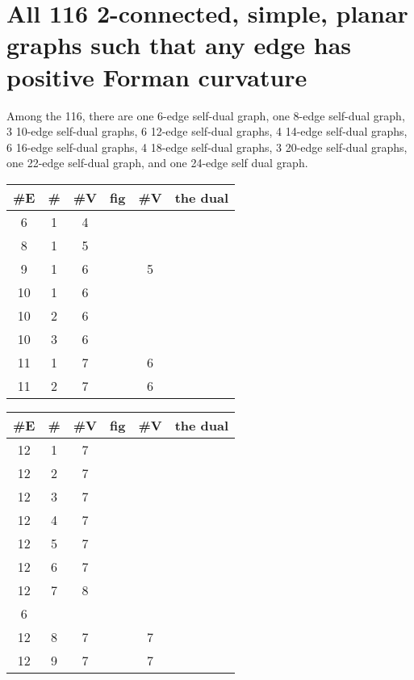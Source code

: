 \documentclass{amsart}
\begin{document}
\section{All 116 2-connected, simple, planar graphs such that any edge
 has positive Forman curvature}

 Among the 116, there are one 6-edge self-dual graph, one 8-edge self-dual graph, 3
 10-edge self-dual graphs, 6 12-edge self-dual graphs, 4 14-edge
 self-dual graphs, 6 16-edge self-dual graphs, 4 18-edge self-dual
 graphs, 3 20-edge self-dual graphs, one 22-edge self-dual graph, and
 one 24-edge self dual graph.
 
  \def\a#1{\texttt{[image: \#1]}}
 \begin{table}[ht]
     \begin{tabular}{|c|c|c|c || c|c|}
      \#E & \# & \#V & fig &\#V & the dual\\
\hline
 6 & 1 & 4 &  \\%
 8 & 1 & 5 &  \\%
 9 & 1 & 6 &   &%
         5 &  \\%
10 & 1 & 6 &  \\%
10 & 2 & 6 &  \\%
10 & 3 & 6 &  \\%
11 & 1 & 7 &   &%
         6 &  \\%
11 & 2 & 7 &   &%
         6 &  \\%
     \end{tabular}
\end{table}
\begin{table}[ht]
     \begin{tabular}{|c|c|c|c || c|c|}
      \#E & \# & \#V & fig & \#V &the dual\\
\hline
12 & 1 & 7 &  \\%
12 & 2 & 7 &  \\%
12 & 3 & 7 &  \\%
12 & 4 & 7 &  \\%
12 & 5 & 7 &  \\%
12 & 6 & 7 &  \\%
12 & 7 & 8 &  \\%
         6 &  \\%
12 & 8 & 7 &   &%
         7 &  \\%
12 & 9 & 7 &   &%
         7 &  \\%
     \end{tabular}
\end{table}
\end{document}
